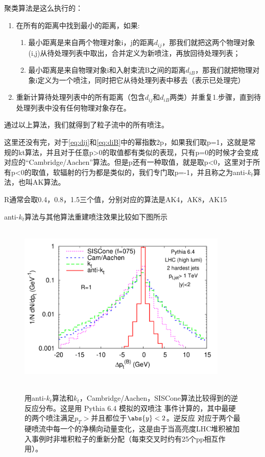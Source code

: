 聚类算法是这么执行的：
\begin{enumerate}
    \item 在所有的距离中找到最小的距离，如果:
    \begin{enumerate}[(1)]
        \item 最小距离是来自两个物理对象i，j的距离$d_{ij}$，那我们就把这两个物理对象(i,j)从待处理列表中取出，合并定义为新喷注，再放回待处理列表；
        \item 最小距离是来自物理对象i和入射束流B之间的距离$d_{iB}$，那我们就把物理对象i定义为一个喷注，同时把它从待处理列表中移去（表示已处理完）
    \end{enumerate}
    \item 重新计算待处理列表中的所有距离（包含$d_{ij}$和$d_{iB}$两类）并重复1.步骤，直到待处理列表中没有任何物理对象存在。
\end{enumerate}
通过以上算法，我们就得到了粒子流中的所有喷注。

这里还没有完，对于\eqref{eq:dij}和\eqref{eq:diB}中的幂指数2p，如果我们取p=1，这就是常规的kt算法，并且对于任意p>0的取值都有类似的表现，只有p=0的时候才会变成对应的“Cambridge/Aachen”算法。但是p还有一种取值，就是取p<0，这里对于所有p<0的取值，软辐射的行为都是类似的，我们专门取p=-1，并且称之为anti-$k_t$算法，也叫AK算法。

R通常会取0.4，0.8，1.5三个值，分别对应的算法是AK4，AK8，AK15

anti-$k_t$算法与其他算法重建喷注效果比较如下图所示
\begin{figure}[H]
 \centering
 \caption{用anti-$k_t$算法和$k_t$，Cambridge/Aachen，SISCone算法比较得到的逆反应分布。这是用 Pythia 6.4 模拟的双喷注 事件计算的，其中最硬的两个喷注满足$p_T>$并且都位于$\abs{y}<2$。逆反应
对应于两个最硬喷流中每一个的净横向动量变化，这是由于当高亮度LHC堆积被加入事例时非堆积粒子的重新分配（每束交叉时约有25个pp相互作用）。}
 \includegraphics[height=8cm, width=10cm]{pictures/anti-kt.png}
 \label{fig2.1}
\end{figure}


